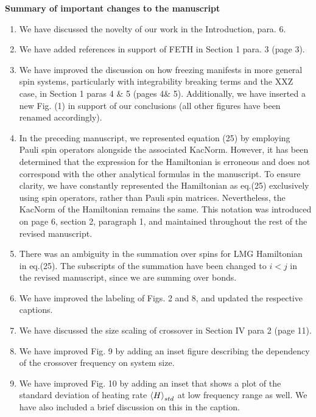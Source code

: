 \documentclass[aps,prb,reprint,showpacs,floatfix,superscriptaddress, onecolumn, nofootinbib, 9pt]{revtex4-2}
\begin{document}
	\vskip 1cm 
	\noindent \textbf{Summary of important changes to the  manuscript}
	\begin{enumerate}
		\item We have discussed the novelty of our work in the Introduction, para. 6.
		\item We have added references in support of FETH in Section 1 para. 3 (page 3).
		\item We have improved the discussion on how freezing manifests in more general spin systems, particularly with integrability breaking terms and the XXZ case, in Section 1 paras 4 \& 5 (pages 4\& 5). Additionally, we have inserted a new Fig. (1) in support of our conclusions (all other figures have been renamed accordingly).
		\item In the preceding manuscript, we represented equation (25) by employing Pauli spin operators alongside the associated KacNorm. However, it has been determined that the expression for the Hamiltonian is erroneous and does not correspond with the other analytical formulas in the manuscript. To ensure clarity, we have constantly represented the Hamiltonian as eq.(25) exclusively using spin operators, rather than Pauli spin matrices. Nevertheless, the KacNorm of the Hamiltonian remains the same. This notation was introduced on page 6, section 2, paragraph 1, and maintained throughout the rest of the revised manuscript. 
		\item There was an ambiguity in the summation over spins for LMG Hamiltonian in eq.(25). The subscripts of the summation have been changed to $i<j$ in the revised manuscript, since we are summing over bonds.
		\item We have improved the labeling of Figs. 2 and 8, and updated the respective captions.
		\item We have discussed the size scaling of crossover in Section IV para 2 (page 11).
		\item We have improved Fig. 9 by adding an inset figure describing the dependency of the crossover frequency on system size.
		\item We have improved Fig. 10 by adding an inset that shows a plot of the standard deviation of heating rate $\expval{H}_{std}$ at low frequency range as well. We have also included a brief discussion on this in the caption.
	\end{enumerate}
	
	
	
	
\end{document}
